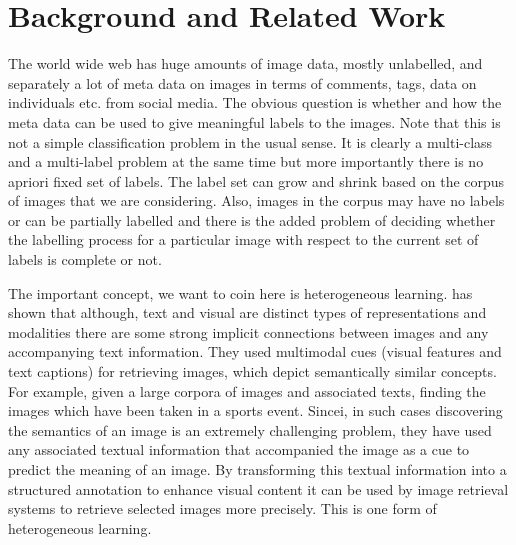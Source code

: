 
\chapter{Background and Related Work} %

\label{relatedWork} %


The world wide web has huge amounts of image data, mostly unlabelled, and separately a lot of meta data on images in terms of comments, tags,  data on individuals etc. from social media. The obvious question is whether and how the meta data can be used to give meaningful labels to the images. Note that this is not a simple classification problem in the usual sense. It is clearly a multi-class and a multi-label problem at the same time but more importantly there is no apriori fixed set of labels. The label set can grow and shrink based on the corpus of images that we are considering. Also, images in the corpus may have no labels or can be partially labelled and there is the added problem of deciding whether the labelling process for a particular image with respect to the current set of labels is complete or not.
 
The important concept, we want to coin here is heterogeneous learning. 
\citet*{kesorn} has shown that although, text and visual are 
distinct types of representations and modalities there are some 
strong implicit connections between images and any accompanying text 
information. They used multimodal cues (visual features and text 
captions) for retrieving images, which depict semantically similar 
concepts. For example, given a large corpora of images and 
associated texts, finding the images which have been taken in a 
sports event.  Sincei, in such cases discovering the semantics of an 
image is an extremely challenging problem, they have used any 
associated textual information that accompanied the image as a cue 
to predict the meaning of an image. By transforming this textual 
information into a structured annotation to enhance visual content 
it can be used by image retrieval systems to retrieve selected 
images more precisely. This is one form of heterogeneous learning. 


